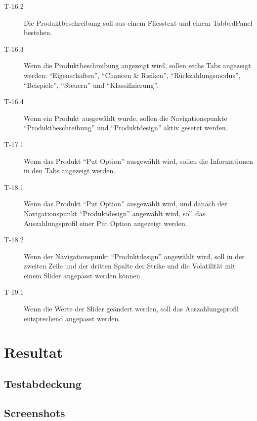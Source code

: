 \begin{description}
\item[T-16.2\label{itm:T-16.2}]
Die Produktbeschreibung soll aus einem Fliesstext und einem TabbedPanel
bestehen.

\item[T-16.3\label{itm:T-16.3}]
Wenn die Produktbeschreibung angezeigt wird, sollen sechs Tabs angezeigt
werden: ``Eigenschaften'', ``Chancen \& Risiken'', ``Rückzahlungsmodus'',
``Beispiele'', ``Steuern'' und ``Klassifizierung''.

\item[T-16.4\label{itm:T-16.4}]
Wenn ein Produkt ausgewählt wurde, sollen die Navigationspunkte
``Produktbeschreibung'' und ``Produktdesign'' aktiv gesetzt werden.

\item[T-17.1\label{itm:T-17.1}]
Wenn das Produkt ``Put Option'' ausgewählt wird, sollen die Informationen in den
Tabs angezeigt werden.

\item[T-18.1\label{img:T-18.1}]
Wenn das Produkt ``Put Option'' ausgewählt wird, und danach der Navigationspunkt
``Produktdesign'' angewählt wird, soll das Auszahlungsprofil einer Put Option
angezeigt werden.

\item[T-18.2\label{img:T-18.2}]
Wenn der Navigationspunkt ``Produktdesign'' angewählt wird, soll in der zweiten
Zeile und der dritten Spalte der Strike und die Volatilität mit einem Slider
angepasst werden können.

\item[T-19.1\label{img:T-19.1}]
Wenn die Werte der Slider geändert werden, soll das Auszahlungsprofil
entsprechend angepasst werden.

\end{description}

\section{Resultat}

\subsection{Testabdeckung}

\subsection{Screenshots}